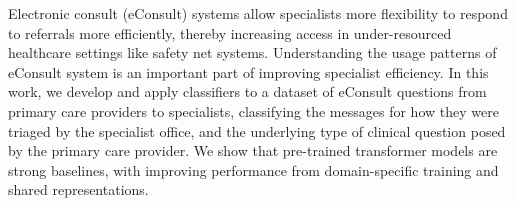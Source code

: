 Electronic consult (eConsult) systems allow specialists more flexibility to respond to referrals more efficiently, thereby increasing access in under-resourced healthcare settings like safety net systems. Understanding the usage patterns of eConsult system is an important part of improving specialist efficiency. In this work, we develop and apply classifiers to a dataset of eConsult questions from primary care providers to specialists, classifying the messages for how they were triaged by the specialist office, and the underlying type of clinical question posed by the primary care provider. We show that pre-trained transformer models are strong baselines, with improving performance from domain-specific training and shared representations.
